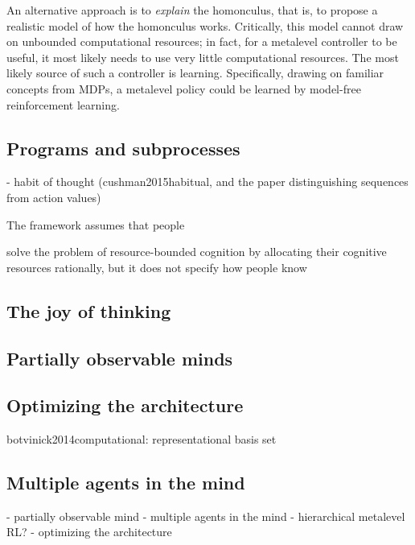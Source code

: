 An alternative approach is to \emph{explain} the homonculus, that is, to propose a realistic model of how the homonculus works. Critically, this model cannot draw on unbounded computational resources; in fact, for a metalevel controller to be useful, it most likely needs to use very little computational resources. The most likely source of such a controller is learning. Specifically, drawing on familiar concepts from MDPs, a metalevel policy could be learned by model-free reinforcement learning.






\subsection{Programs and subprocesses}
  - habit of thought (cushman2015habitual, and the paper distinguishing sequences from action values)







The framework assumes that people 

solve the problem of resource-bounded cognition by allocating their cognitive resources rationally, but it does not specify how people know 



\subsection{The joy of thinking}

\subsection{Partially observable minds}

\subsection{Optimizing the architecture}

botvinick2014computational: representational basis set

\subsection{Multiple agents in the mind}


- partially observable mind
- multiple agents in the mind
- hierarchical metalevel RL?
- optimizing the architecture

